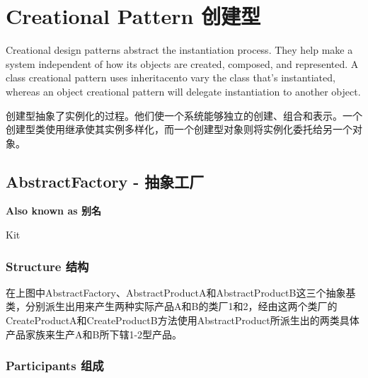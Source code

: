 \chapter{Creational Pattern 创建型}

Creational design patterns abstract the instantiation process. They help make a system independent of how its objects are created, composed, and represented. A class creational pattern uses inheritacento vary the class that's instantiated, whereas an object creational pattern will delegate instantiation to another object.

创建型抽象了实例化的过程。他们使一个系统能够独立的创建、组合和表示。一个创建型类使用继承使其实例多样化，而一个创建型对象则将实例化委托给另一个对象。

\section{AbstractFactory - 抽象工厂}

\textbf{Also known as 别名}

Kit

\subsection{Structure 结构}


在上图中AbstractFactory、AbstractProductA和AbstractProductB这三个抽象基类，分别派生出用来产生两种实际产品A和B的类厂1和2，经由这两个类厂的CreateProductA和CreateProductB方法使用AbstractProduct所派生出的两类具体产品家族来生产A和B所下辖1-2型产品。

\subsection{Participants 组成}

